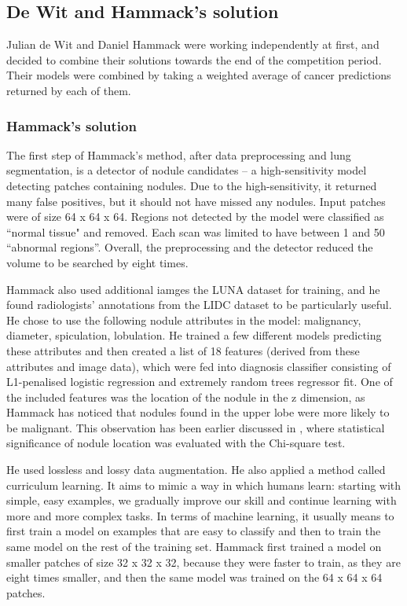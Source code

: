 \documentclass[12pt]{article}
\begin{document}
\subsection{De Wit and Hammack's solution}
Julian de Wit and Daniel Hammack were working independently at first, and decided to combine their solutions towards the end of the competition period. Their models were combined by taking a weighted average of cancer predictions returned by each of them.

\subsubsection{Hammack's solution}
The first step of Hammack's method, after data preprocessing and lung segmentation, is a detector of nodule candidates \--- a high-sensitivity model detecting patches containing nodules. Due to the high-sensitivity, it returned many false positives, but it should not have missed any nodules. Input patches were of size 64 x 64 x 64. Regions not detected by the model were classified as ``normal tissue" and removed. Each scan was limited to have between 1 and 50 ``abnormal regions''. Overall, the preprocessing and the detector reduced the volume to be searched by eight times.   

Hammack also used additional iamges the LUNA dataset for training, and he found radiologists' annotations from the LIDC dataset to be particularly useful. He chose to use the following nodule attributes in the model:  malignancy, diameter, spiculation, lobulation. He trained a few different models predicting these attributes and then created a list of 18 features (derived from these attributes and image data), which were fed into diagnosis classifier consisting of L1-penalised logistic regression and extremely random trees regressor fit. One of the included features was the location of the nodule in the z dimension, as Hammack has noticed that nodules found in the upper lobe were more likely to be malignant. This observation has been earlier discussed in \citep{perandini2016distribution}, where statistical significance of nodule location was evaluated with the Chi-square test.

He used lossless and lossy data augmentation. He also applied a method called curriculum learning. It aims to mimic a way in which humans learn: starting with simple, easy examples, we gradually improve our skill and continue learning with more and more complex tasks. In terms of machine learning, it usually means to first train a model on examples that are easy to classify and then to train the same model on the rest of the training set. Hammack first trained a model on smaller patches of size 32 x 32 x 32, because they were faster to train, as they are eight times smaller, and then the same model was trained on the 64 x 64 x 64 patches.
\end{document}
